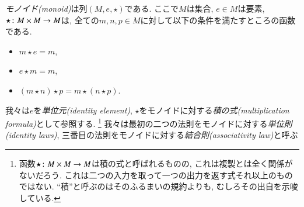 \begin{definition}[モノイド]\label{def:monoid}


\emph{モノイド(monoid)}は列$(M,e,\star)$である. ここで$M$は集合, $e\in M$は要素, $\star\colon M\times M\rightarrow M$は, 全ての$m,n,p\in M$に対して以下の条件を満たすところの函数である.
\begin{itemize}
\item $m\star e=m$,
\item $e\star m=m$,
\item $(m\star n)\star p=m\star(n\star p)$.
\end{itemize}
我々は$e$を\emph{単位元(identity element)}, $\star$をモノイドに対する\emph{積の式(multiplication formula)}として参照する.
\footnote{函数$\star\colon M\times M\rightarrow M$は積の式と呼ばれるものの, これは複製とは全く関係がないだろう. これは二つの入力を取って一つの出力を返す式それ以上のものではない. ``積''と呼ぶのはそのふるまいの規約よりも, むしろその出自を示唆している.}
我々は最初の二つの法則をモノイドに対する\emph{単位則(identity laws)}, 三番目の法則をモノイドに対する\emph{結合則(associativity law)}と呼ぶ

\end{definition}

